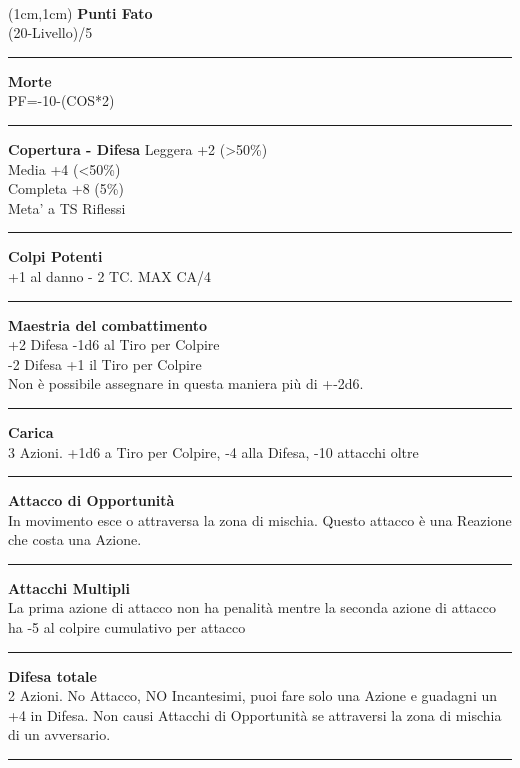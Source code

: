 \documentclass[a4paper,12 pt,openany]{book}
\newcommand{\riga}{\rule{\textwidth}{0.4pt}}
\begin{document}
~\newpage

\begin{textblock*}{4cm}(1cm,1cm) %
{\textbf{Punti Fato}\\
(20-Livello)/5}

\riga

{\textbf{Morte}\\
PF=-10-(COS*2)}

\riga

\textbf{Copertura - Difesa}
Leggera +2 (>50\%)\\
Media +4 (<50\%)\\
Completa +8 (5\%)\\
Meta' a TS Riflessi

\riga

\textbf{Colpi Potenti}\\
+1 al danno - 2 TC. MAX CA/4

\riga

\textbf{Maestria del combattimento}\\
+2 Difesa -1d6 al Tiro per Colpire\\
-2 Difesa +1 il Tiro per Colpire \\
Non è possibile assegnare in questa maniera più di +-2d6.

\riga

\textbf{Carica}\\
3 Azioni. +1d6 a Tiro per Colpire, -4 alla Difesa, -10 attacchi oltre

\riga

\textbf{Attacco di Opportunità}\\
In movimento esce o attraversa la zona di mischia. Questo attacco è una Reazione che costa una Azione.

\riga

\textbf{Attacchi Multipli}\\
La prima azione di attacco non ha penalità mentre la seconda azione di attacco ha -5 al colpire cumulativo per attacco

\riga

\textbf{Difesa totale}\\
2 Azioni. No Attacco, NO Incantesimi, puoi fare solo una Azione e guadagni un +4 in Difesa. Non causi Attacchi di Opportunità se attraversi la zona di mischia di un avversario.

\riga


\end{textblock*}
\end{document}
